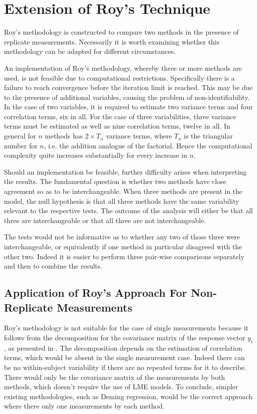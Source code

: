 \documentclass[12pt, a4paper]{report}
\theoremstyle{plain}
\theoremstyle{definition}
\theoremstyle{remark}
\begin{document}
\section{Extension of Roy's Technique}
Roy's methodology is constructed to compare two methods in the presence of replicate measurements. Necessarily it is worth examining whether this methodology can be adapted for different circumstances.
		
An implementation of Roy's methodology, whereby three or more methods are used, is not feasible due to computational restrictions. Specifically there is a failure to reach convergence before the iteration limit is reached. This may be due to the presence of additional variables, causing the problem of non-identifiability. In the case of two variables, it is required to estimate two variance terms and four correlation terms, six in all. For the case of three variabilities, three variance terms must be estimated as well as nine correlation terms, twelve in all. In general for $n$ methods has $2 \times T_{n}$ variance terms, where $T_n$ is the triangular number for $n$, i.e. the addition analogue of the factorial. Hence the computational complexity quite increases substantially for every increase in $n$.
		
Should an implementation be feasible, further difficulty arises when interpreting the results. The fundamental question is whether two methods have close agreement so as to be interchangeable. When three methods are present in the model, the null hypothesis is that all three methods have the same variability relevant to the respective tests. The outcome of the analysis will either be that all three are interchangeable or that all three are not interchangeable.
		
The tests would not be informative as to whether any two of those three were interchangeable, or equivalently if one method in particular disagreed with the other two. Indeed it is easier to perform three pair-wise comparisons separately and then to combine the results.
		

		
		\subsection{Application of Roy's Approach For Non-Replicate Measurements}
		
		Roy's methodology is not suitable for the case of single measurements because it follows from the decomposition for the covariance matrix of the response vector $y_{i}$, as presented in \citet{hamlett}. The decomposition depends on the estimation of correlation terms, which would be absent in the single measurement case. Indeed there can be no within-subject variability if there are no repeated terms for it to describe. There would only be the covariance matrix of the measurements by both methods, which doesn't require the use of LME models. To conclude, simpler existing methodologies, such as Deming regression, would be the correct approach where there only one measurements by each method.
		
\end{document}
